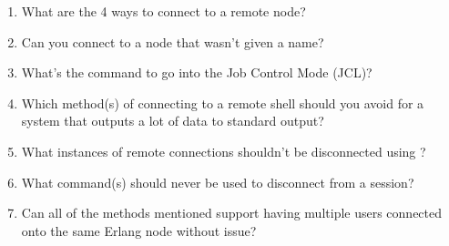 \documentclass[11pt, oneside]{book}   	%
\begin{document}
\begin{enumerate}
	\item What are the 4 ways to connect to a remote node?
	\item Can you connect to a node that wasn't given a name?
	\item What's the command to go into the Job Control Mode (JCL)?
	\item Which method(s) of connecting to a remote shell should you avoid for a system that outputs a lot of data to standard output?
	\item What instances of remote connections shouldn't be disconnected using ?
	\item What command(s) should never be used to disconnect from a session?
	\item Can all of the methods mentioned support having multiple users connected onto the same Erlang node without issue?
\end{enumerate}


\end{document}
